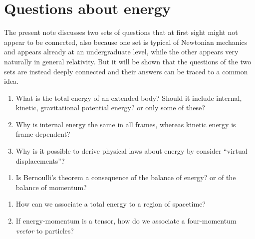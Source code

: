 \documentclass[a4paper,12pt,%
onecolumn,oneside,article,%
british%
]{memoir}
\renewcommand*{\|}[1][]{\nonscript\:#1\vert\nonscript\:\mathopen{}}
\begin{document}


\section{Questions about energy}
\label{sec:intro}

The present note discusses two sets of questions that at first sight might not appear to be connected, also because one set is typical of Newtonian mechanics and appears already at an undergraduate level, while the other appears very naturally in general relativity. But it will be shown that the questions of the two sets are instead deeply connected and their answers can be traced to a common idea.

\begin{enumerate}[label=A\arabic*.,ref=A\arabic*]
\item\label{item:def_total_energy} What is the total energy of an extended body? Should it include internal, kinetic, gravitational potential energy? or only some of these?
\item\label{item:frame_indifference_energy} Why is internal energy the same in all frames, whereas kinetic energy is frame-dependent?
\item\label{item:virtual_work} Why is it possible to derive physical laws about energy by consider \enquote{virtual displacements}?
\end{enumerate}

\begin{enumerate}[label=A\arabic*.,ref=A\arabic*,start=4]
\item\label{item:bernoulli_theorem}Is Bernoulli's theorem a consequence of the balance of energy? or of the balance of momentum?
\end{enumerate}

\begin{enumerate}[label=B\arabic*.,ref=B\arabic*]
\item\label{item:integrate_energy} How can we associate a total energy to a region of spacetime?
\item\label{item:particle_energy_momentum} If energy-momentum is a tensor, how do we associate a four-momentum \emph{vector} to particles?
\end{enumerate}
\end{document}

